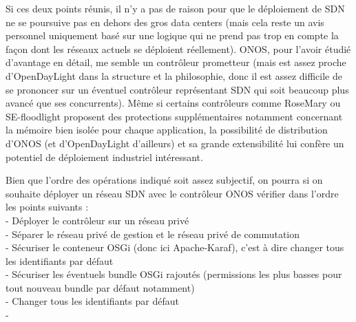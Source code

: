 Si ces deux points réunis, il n'y a pas de raison pour que le déploiement de SDN ne se poursuive pas en dehors des gros data centers (mais cela reste un avis personnel uniquement basé sur une logique qui ne prend pas trop en compte la façon dont les réseaux actuels se déploient réellement). ONOS, pour l'avoir étudié d'avantage en détail, me semble un contrôleur prometteur (mais est assez proche d'OpenDayLight dans la structure et la philosophie, donc il est assez difficile de se prononcer sur un éventuel contrôleur représentant SDN qui soit beaucoup plus avancé que ses concurrents). Même si certains contrôleurs comme RoseMary ou SE-floodlight proposent des protections supplémentaires notamment concernant la mémoire bien isolée pour chaque application, la possibilité de distribution d'ONOS (et d'OpenDayLight d'ailleurs) et sa grande extensibilité lui confère un potentiel de déploiement industriel intéressant. 

Bien que l'ordre des opérations indiqué soit assez subjectif, on pourra si on souhaite déployer un réseau SDN avec le contrôleur ONOS vérifier dans l'ordre les points suivants :\\
- Déployer le contrôleur sur un réseau privé\\
- Séparer le réseau privé de gestion et le réseau privé de commutation\\
- Sécuriser le conteneur OSGi (donc ici Apache-Karaf), c'est à dire changer tous les identifiants par défaut\\
- Sécuriser les éventuels bundle OSGi rajoutés (permissions les plus basses pour tout nouveau bundle par défaut notamment)\\
- Changer tous les identifiants par défaut\\
-